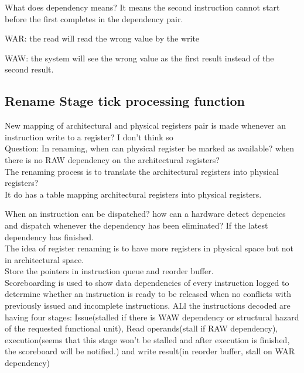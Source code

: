 \documentclass[11pt]{article}
\begin{document}
What does dependency means? It means the second instruction cannot start before the first completes in the dependency pair.

WAR: the read will read the wrong value by the write

WAW: the system will see the wrong value as the first result instead of the second result.

\subsection{Rename Stage tick processing function\\}

New mapping of architectural and physical registers pair is made whenever an instruction write to a register? I don't think so\\

Question: In renaming, when can physical register be marked as available? when there is no RAW dependency on the architectural registers?\\

The renaming process is to translate the architectural registers into physical registers?\\ It do has a table mapping architectural registers into physical registers. 

When an instruction can be dispatched? how can a hardware detect depencies and dispatch whenever the dependency has been eliminated? If the latest dependency has finished.\\

The idea of register renaming is to have more registers in physical space but not in architectural space.\\

Store the pointers in instruction queue and reorder buffer.\\

Scoreboarding is used to show data dependencies of every instruction logged to determine whether an instruction is ready to be released when no conflicts with previously issued and incomplete instructions. ALl the instructions decoded are having four stages: Issue(stalled if there is WAW dependency or structural hazard of the requested functional unit), Read operands(stall if RAW dependency), execution(seems that this stage won't be stalled and after execution is finished, the scoreboard will be notified.) and write result(in reorder buffer, stall on WAR dependency)\\
\end{document}
